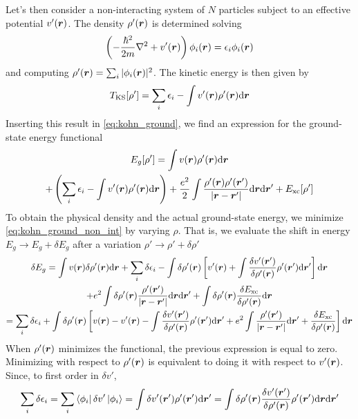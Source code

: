 Let's then consider a non-interacting system of $N$ particles subject to an effective potential $v'(\mathbf{\boldsymbol{r}})$. The density $\rho'(\mathbf{\boldsymbol{r}})$ is determined solving
\begin{equation}
    \left(-\frac{\hbar^2}{2m} \laplacian + \rr{v'} \right) \rr{\phi_i} = \epsilon_i \rr{\phi_i}
\end{equation}
and computing $\rho'(\mathbf{\boldsymbol{r}}) = \sum_i |\phi_i(\mathbf{\boldsymbol{r}})|^2$. The kinetic energy is then given by
\begin{equation}
    T_\text{KS}[\rho'] = \sum_i \epsilon_i - \int \rr{v'} \rr{\rho'} \dr
\end{equation}
Inserting this result in \cref{eq:kohn_ground}, we find an expression for the ground-state energy functional
\begin{multline} \label{eq:kohn_ground_non_int}
    E_g[\rho'] = \int \rr{v} \rr{\rho'} \dr
    \\+ \left(\sum_i \epsilon_i - \int \rr{v'} \rr{\rho'} \dr\right) + \frac{e^2}{2} \int \frac{\rho'(\vec{r})\rho'(\vec{r}')}{|\vec{r}-\vec{r}'|}  \dr \dr' + E_\text{xc}[\rho']
\end{multline}
To obtain the physical density and the actual ground-state energy, we minimize \cref{eq:kohn_ground_non_int} by varying $\rho$. That is, we evaluate the shift in energy $E_g \rightarrow E_g + \delta E_g$ after a variation $\rho' \rightarrow \rho' + \delta\rho'$
\begin{multline} \label{eq:kohn_ground_variation}
    \delta E_g =
    \int \rr{v} \delta\rr{\rho'} \dr
    + \sum_i \delta \epsilon_i
    - \int \delta \rr{\rho'} \left[ \rr{v'} + \int \frac{\delta v'(\vec{r}')}{\delta\rr{\rho'}}\rho'(\vec{r}') \dr' \right] \dr
    \\+ e^2 \int \delta\rr{\rho'} \frac{\rho'(\vec{r}')}{|\vec{r}-\vec{r}'|}  \dr \dr'
    + \int \delta\rr{\rho'} \frac{\delta E_\text{xc}}{\delta\rr{\rho'}} \dr
    \\ = \sum_i \delta \epsilon_i + \int \delta\rr{\rho'} \left[ \rr{v} - \rr{v'} - \int \frac{\delta v'(\vec{r}')}{\delta\rr{\rho'}}\rho'(\vec{r}') \dr' + e^2 \int \frac{\rho'(\vec{r}')}{|\vec{r}-\vec{r}'|} \dr' + \frac{\delta E_\text{xc}}{\delta\rr{\rho'}} \right] \dr
\end{multline}
When $\rho'(\mathbf{\boldsymbol{r}})$ minimizes the functional, the previous expression is equal to zero. Minimizing with respect to $\rho'(\mathbf{\boldsymbol{r}})$ is equivalent to doing it with respect to $v'(\mathbf{\boldsymbol{r}})$. Since, to first order in $\delta v'$,
\begin{equation}
    \sum_i \delta \epsilon_i = \sum_i \bra{\phi_i} \delta v' \ket{\phi_i}
    = \int \rrp{\delta v'} \rrp{\rho'} \dr'
    = \int \delta \rr{\rho'} \frac{\delta v'(\vec{r}')}{\delta \rr{\rho'}} \rrp{\rho'} \dr \dr'
\end{equation}
